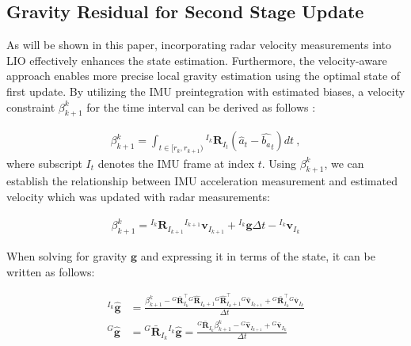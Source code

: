 \subsection{Gravity Residual for Second Stage Update}
\label{subsec:second_update}
As will be shown in this paper, incorporating radar velocity measurements into \ac{LIO} effectively enhances the state estimation. Furthermore, the velocity-aware approach enables more precise local gravity estimation using the optimal state of first update. By utilizing the \ac{IMU} preintegration with estimated biases, a velocity constraint $\beta_{k+1}^{k}$ for the time interval can be derived as follows \cite{qin2018vins}: 

\vspace{-4mm}\small
\begin{eqnarray}
  \label{eq:IMU preintegration}
    \beta_{k+1}^k=\int_{t\in[r_k,r_{k+1})}{}^{I_k}\textbf{R}_{I_t}(\widehat{a}_t-\widehat{b_a}_t)dt~,
\end{eqnarray}
\normalsize
where subscript ${I_t}$ denotes the \ac{IMU} frame at index $t$. Using $\beta_{k+1}^{k}$, we can establish the relationship between \ac{IMU} acceleration measurement and estimated velocity which was updated with radar measurements:

\vspace{-4mm}\small
\begin{eqnarray}
  \label{eq:gravity relation}
    \beta_{k+1}^k={}^{I_k}\textbf{R}_{I_{k+1}}{}^{I_{k+1}}\textbf{v}_{I_{k+1}}+{}^{I_k}\textbf{g}\Delta t-{}^{I_k}\textbf{v}_{I_k}
\end{eqnarray}
\normalsize

When solving for gravity $\textbf{g}$ and expressing it in terms of the state, it can be written as follows:

\vspace{-3mm}\small
\begin{align}
  \label{eq:gravity term}
   {}^{I_k}\widehat{\textbf{g}}&=\frac{\beta^{k}_{k+1}-{}^G\bar{\textbf{R}}_{I_k}^\top{}^G\widehat{\textbf{R}}_{I_k+1}{}^G\widehat{\textbf{R}}_{I_k+1}^\top{}^G\widehat{\textbf{v}}_{I_{k+1}}+{}^G\bar{\textbf{R}}_{I_k}^\top{}^G\bar{\textbf{v}}_{I_k}}{\Delta t} \nonumber \\
   {}^G\widehat{\textbf{g}}&={}^G\bar{\textbf{R}}_{I_k}{}^{I_k}\widehat{\textbf{g}}
   =\frac{{}^G\bar{\textbf{R}}_{I_k}\beta^k_{k+1}-{}^G\widehat{\textbf{v}}_{I_{k+1}}+{}^G\bar{\textbf{v}}_{I_k}}{\Delta t}
\end{align}
\normalsize

